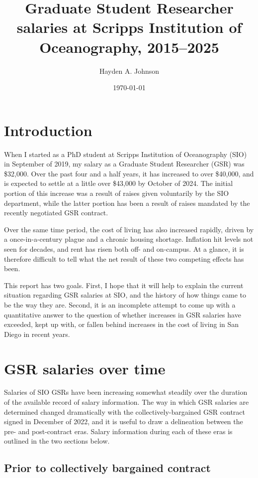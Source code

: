 \documentclass{article}
\title{Graduate Student Researcher salaries at Scripps Institution of Oceanography, 2015--2025}
\author{Hayden A. Johnson}
\date{\today}
\begin{document}
\maketitle

\section{Introduction}

When I started as a PhD student at Scripps Institution of Oceanography (SIO) in September of 2019, my salary as a Graduate Student Researcher (GSR) was \$32,000. Over the past four and a half years, it has increased to over \$40,000, and is expected to settle at a little over \$43,000 by October of 2024. The initial portion of this increase was a result of raises given voluntarily by the SIO department, while the latter portion has been a result of raises mandated by the recently negotiated GSR contract.

Over the same time period, the cost of living has also increased rapidly, driven by a once-in-a-century plague and a chronic housing shortage. Inflation hit levels not seen for decades, and rent has risen both off- and on-campus. At a glance, it is therefore difficult to tell what the net result of these two competing effects has been.

This report has two goals. First, I hope that it will help to explain the current situation regarding GSR salaries at SIO, and the history of how things came to be the way they are. Second, it is an incomplete attempt to come up with a quantitative answer to the question of whether increases in GSR salaries have exceeded, kept up with, or fallen behind increases in the cost of living in San Diego in recent years.

\section{GSR salaries over time}

Salaries of SIO GSRs have been increasing somewhat steadily over the duration of the available record of salary information. The way in which GSR salaries are determined changed dramatically with the collectively-bargained GSR contract signed in December of 2022, and it is useful to draw a delineation between the pre- and post-contract eras. Salary information during each of these eras is outlined in the two sections below.

\subsection{Prior to collectively bargained contract}
\end{document}
